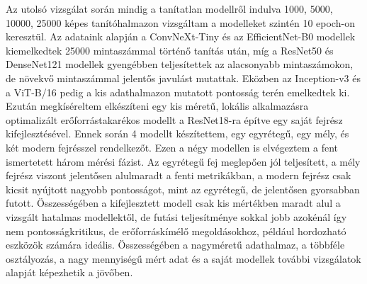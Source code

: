 Az utolsó vizsgálat során mindig a tanítatlan modellről indulva 1000, 5000, 10000, 25000 képes tanítóhalmazon vizsgáltam a modelleket szintén 10 epoch-on keresztül.
Az adataink alapján a ConvNeXt-Tiny és az EfficientNet-B0 modellek kiemelkedtek 25000 mintaszámmal történő tanítás után, míg a ResNet50 és DenseNet121 modellek gyengébben teljesítettek az alacsonyabb mintaszámokon, de növekvő mintaszámmal jelentős javulást mutattak. Eközben az Inception-v3 és a ViT-B/16 pedig a kis adathalmazon mutatott pontosság terén emelkedtek ki.
Ezután megkíséreltem elkészíteni egy kis méretű, lokális alkalmazásra optimalizált erőforrástakarékos modellt a ResNet18-ra építve egy saját fejrész kifejlesztésével. 
Ennek során 4 modellt készítettem, egy egyrétegű, egy mély, és két modern fejrésszel rendelkezőt. Ezen a négy modellen is elvégeztem a fent ismertetett három mérési fázist. Az egyrétegű fej meglepően jól teljesített, a mély fejrész viszont jelentősen alulmaradt a fenti metrikákban, a modern fejrész csak kicsit nyújtott nagyobb pontosságot, mint az egyrétegű, de jelentősen gyorsabban futott. Összességében a kifejlesztett modell csak kis mértékben maradt alul a vizsgált hatalmas modellektől, de futási teljesítménye sokkal jobb azokénál így nem pontosságkritikus, de erőforráskímélő megoldásokhoz, például hordozható eszközök számára ideális.
Összességében a nagyméretű adathalmaz, a többféle osztályozás, a nagy mennyiségű mért adat és a saját modellek további vizsgálatok alapját képezhetik a jövőben.